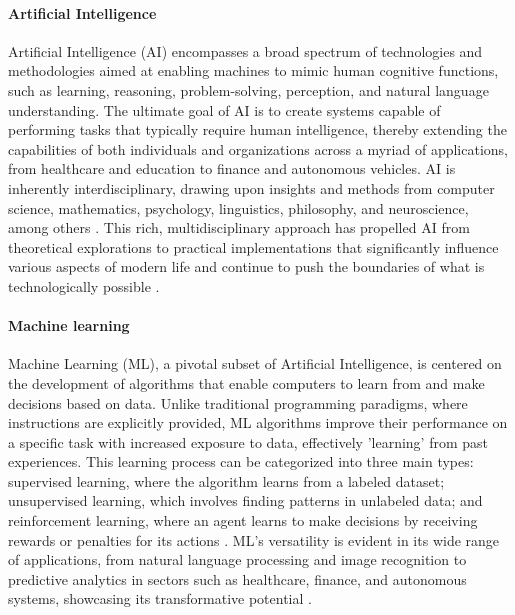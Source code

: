 \documentclass{article}
\begin{document}
\paragraph{Artificial Intelligence}
Artificial Intelligence (AI) encompasses a broad spectrum of technologies and methodologies aimed at enabling machines to mimic human cognitive functions, such as learning, reasoning, problem-solving, perception, and natural language understanding. The ultimate goal of AI is to create systems capable of performing tasks that typically require human intelligence, thereby extending the capabilities of both individuals and organizations across a myriad of applications, from healthcare and education to finance and autonomous vehicles. AI is inherently interdisciplinary, drawing upon insights and methods from computer science, mathematics, psychology, linguistics, philosophy, and neuroscience, among others \cite{RussellNorvig2020}. This rich, multidisciplinary approach has propelled AI from theoretical explorations to practical implementations that significantly influence various aspects of modern life and continue to push the boundaries of what is technologically possible \cite{KaplanHaenlein2019}.

\paragraph{Machine learning}
Machine Learning (ML), a pivotal subset of Artificial Intelligence, is centered on the development of algorithms that enable computers to learn from and make decisions based on data. Unlike traditional programming paradigms, where instructions are explicitly provided, ML algorithms improve their performance on a specific task with increased exposure to data, effectively 'learning' from past experiences. This learning process can be categorized into three main types: supervised learning, where the algorithm learns from a labeled dataset; unsupervised learning, which involves finding patterns in unlabeled data; and reinforcement learning, where an agent learns to make decisions by receiving rewards or penalties for its actions \cite{Bishop2006}. ML's versatility is evident in its wide range of applications, from natural language processing and image recognition to predictive analytics in sectors such as healthcare, finance, and autonomous systems, showcasing its transformative potential \cite{JordanMitchell2015}.
\end{document}
